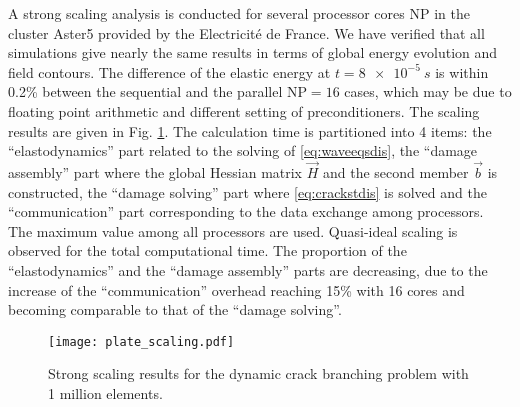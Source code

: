 A strong scaling analysis is conducted for several processor cores $\mathrm{NP}$ in the cluster Aster5 \cite{DelmasLefebvre:2014} provided by the Electricité de France. We have verified that all simulations give nearly the same results in terms of global energy evolution and field contours. The difference of the elastic energy at $t=\SI{8e-5}{s}$ is within 0.2\% between the sequential and the parallel $\mathrm{NP}=16$ cases, which may be due to floating point arithmetic and different setting of preconditioners. The scaling results are given in Fig. \ref{fig:scaling}. The calculation time is partitioned into 4 items: the ``elastodynamics'' part related to the solving of \eqref{eq:waveeqsdis}, the ``damage assembly'' part where the global Hessian matrix $\vec{H}$ and the second member $\vec{b}$ is constructed, the ``damage solving'' part where \eqref{eq:crackstdis} is solved and the ``communication'' part corresponding to the data exchange among processors. The maximum value among all processors are used. Quasi-ideal scaling is observed for the total computational time. The proportion of the ``elastodynamics'' and the ``damage assembly'' parts are decreasing, due to the increase of the ``communication'' overhead reaching 15\% with 16 cores and becoming comparable to that of the ``damage solving''.
\begin{figure}[htbp]
\centering
\texttt{[image: plate\_scaling.pdf]}
\caption{Strong scaling results for the dynamic crack branching problem with 1 million elements.} \label{fig:scaling}
\end{figure}

